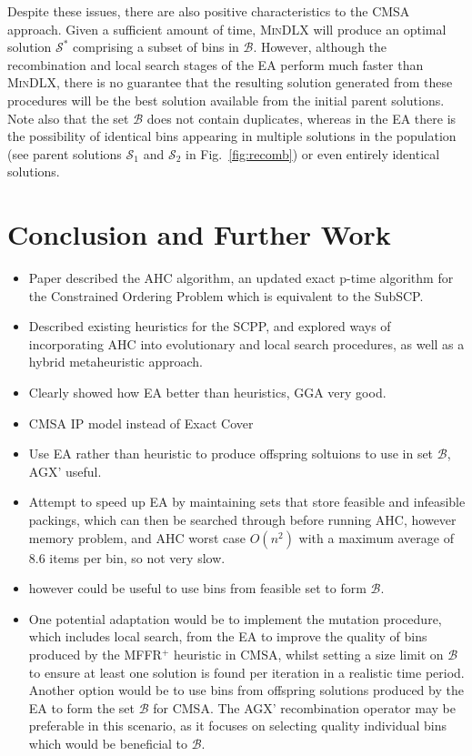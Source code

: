 \documentclass[authoryear]{elsarticle}
\begin{document}
Despite these issues, there are also positive characteristics to the CMSA approach. Given a sufficient amount of time, \textsc{MinDLX} will produce an optimal solution $\mathcal{S}^*$ comprising a subset of bins in $\mathcal{B}$. However, although the recombination and local search stages of the EA perform much faster than \textsc{MinDLX}, there is no guarantee that the resulting solution generated from these procedures will be the best solution available from the initial parent solutions. Note also that the set $\mathcal{B}$ does not contain duplicates, whereas in the EA there is the possibility of identical bins appearing in multiple solutions in the population (see parent solutions $\mathcal{S}_1$ and $\mathcal{S}_2$ in Fig.~\ref{fig:recomb}) or even entirely identical solutions.



\section{Conclusion and Further Work}
\label{sec:conclusion}
{\color{myPurple}
\begin{itemize}[leftmargin=*]
	\item Paper described the AHC algorithm, an updated exact p-time algorithm for the Constrained Ordering Problem which is equivalent to the SubSCP. 
	\item Described existing heuristics for the SCPP, and explored ways of incorporating AHC into evolutionary and local search procedures, as well as a hybrid metaheuristic approach.
	\item Clearly showed how EA better than heuristics, GGA very good.
	\item CMSA IP model instead of Exact Cover
	\item Use EA rather than heuristic to produce offspring soltuions to use in set $\mathcal{B}$, AGX' useful.
	\item Attempt to speed up EA by maintaining sets that store feasible and infeasible packings, which can then be searched through before running AHC, however memory problem, and AHC worst case $O(n^2)$ with a maximum average of 8.6 items per bin, so not very slow.
	\item however could be useful to use bins from feasible set to form $\mathcal{B}$. 
	\item One potential adaptation would be to implement the mutation procedure, which includes local search, from the EA to improve the quality of bins produced by the MFFR$^+$ heuristic in CMSA, whilst setting a size limit on $\mathcal{B}$ to ensure at least one solution is found per iteration in a realistic time period. Another option would be to use bins from offspring solutions produced by the EA to form the set $\mathcal{B}$ for CMSA. The AGX' recombination operator may be preferable in this scenario, as it focuses on selecting quality individual bins which would be beneficial to $\mathcal{B}$.
\end{itemize}
}
\end{document}
